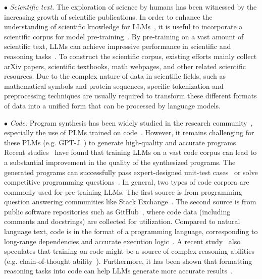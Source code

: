 $\bullet$ \emph{Scientific text.} The exploration of science by humans has been witnessed by the increasing growth  of scientific publications. In order to enhance the understanding of scientific knowledge for LLMs~\cite{Taylor-arxiv-2022-Galactica,Lewkowycz-arxiv-2022-Solving}, it is useful to incorporate a scientific corpus for model pre-training~\cite{Taylor-arxiv-2022-Galactica,Lewkowycz-arxiv-2022-Solving}. By pre-training on a vast amount of scientific text, LLMs can achieve impressive performance in scientific and reasoning tasks~\cite{Saier-arxiv-2023-unarXive}. To construct the scientific corpus, existing efforts mainly collect arXiv papers, {scientific textbooks}, math webpages, and other related scientific resources. Due to the complex nature of data in scientific fields, such as mathematical symbols and protein sequences, specific tokenization and preprocessing techniques are usually required to transform these different formats of data into a unified form that can be processed by language models.

$\bullet$ \emph{Code.} Program synthesis has been widely studied in the research community~\cite{Simon-JACM-1963-Experiments,Manna-CommunACM-1971-Toward,Feng-EMNLPFindings-2020-CodeBERT,Chen-arxiv-2021-evaluating,Austin-arxiv-2021-Program}, especially the use of PLMs trained on code~\cite{Black-GitHub-2021-GPT-Neo,Wang-GitHub-2021-GPT-J}. However, it remains challenging for these PLMs (e.g. GPT-J~\cite{Wang-GitHub-2021-GPT-J}) to generate high-quality and accurate programs. Recent studies~\cite{Chen-arxiv-2021-evaluating,Austin-arxiv-2021-Program} have found that training LLMs  on a vast code corpus can lead to a substantial improvement in the quality of the synthesized programs. The generated programs can successfully pass expert-designed unit-test cases~\cite{Chen-arxiv-2021-evaluating} or solve competitive programming questions~\cite{Li-Science-2022-AlphaCode}. {In general, two types of code corpora are commonly used for pre-training LLMs. The first source is  from programming question answering  communities like Stack Exchange~\cite{Xu-SIGPLAN-2022-Systematic}. The second source is  from public software repositories such as GitHub~\cite{Chen-arxiv-2021-evaluating,Austin-arxiv-2021-Program,nijkamp-arxiv-2022-Codegen}, where code data (including comments and docstrings)  are collected for utilization.} Compared to natural language text, code is  in the format of a programming language, corresponding to long-range  dependencies and accurate execution logic~\cite{Madaan-emnlp-2022-Language}. {A recent study~\cite{FU-blog-2022-how}} also speculates that training on code might be a source of complex reasoning abilities (e.g. chain-of-thought ability~\cite{Wei-arxiv-2022-chain}). {Furthermore, it has been shown that  formatting reasoning tasks into code can help  LLMs generate more accurate results~\cite{Madaan-emnlp-2022-Language}.}

